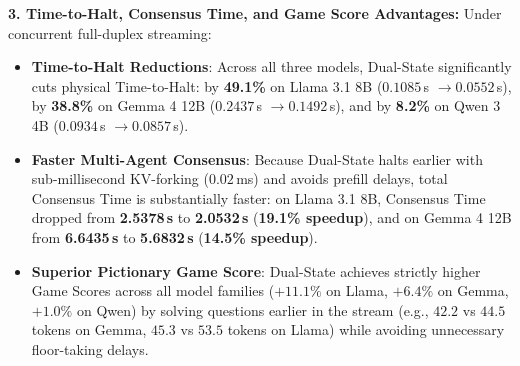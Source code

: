 \documentclass{article}
\begin{document}
\begin{table}[h]
\centering
\caption{\textbf{Comprehensive Token Accounting Breakdown (HANDRAISER Benchmark, 200 Scenarios).} Average tokens processed per scenario with stream length of 63.4 tokens (13.1 chunks of $k=5$).}
\label{tab:token_accounting}
\vspace{0.2cm}
\end{table}

\textbf{3. Time-to-Halt, Consensus Time, and Game Score Advantages:}
Under concurrent full-duplex streaming:
\begin{itemize}
    \item \textbf{Time-to-Halt Reductions}: Across all three models, Dual-State significantly cuts physical Time-to-Halt: by \textbf{49.1\%} on Llama 3.1 8B ($0.1085$\,s $\to 0.0552$\,s), by \textbf{38.8\%} on Gemma 4 12B ($0.2437$\,s $\to 0.1492$\,s), and by \textbf{8.2\%} on Qwen 3 4B ($0.0934$\,s $\to 0.0857$\,s).
    \item \textbf{Faster Multi-Agent Consensus}: Because Dual-State halts earlier with sub-millisecond KV-forking ($0.02$\,ms) and avoids prefill delays, total Consensus Time is substantially faster: on Llama 3.1 8B, Consensus Time dropped from \textbf{2.5378\,s} to \textbf{2.0532\,s} (\textbf{19.1\% speedup}), and on Gemma 4 12B from \textbf{6.6435\,s} to \textbf{5.6832\,s} (\textbf{14.5\% speedup}).
    \item \textbf{Superior Pictionary Game Score}: Dual-State achieves strictly higher Game Scores across all model families ($+11.1\%$ on Llama, $+6.4\%$ on Gemma, $+1.0\%$ on Qwen) by solving questions earlier in the stream (e.g., $42.2$ vs $44.5$ tokens on Gemma, $45.3$ vs $53.5$ tokens on Llama) while avoiding unnecessary floor-taking delays.
\end{itemize}
\end{document}
